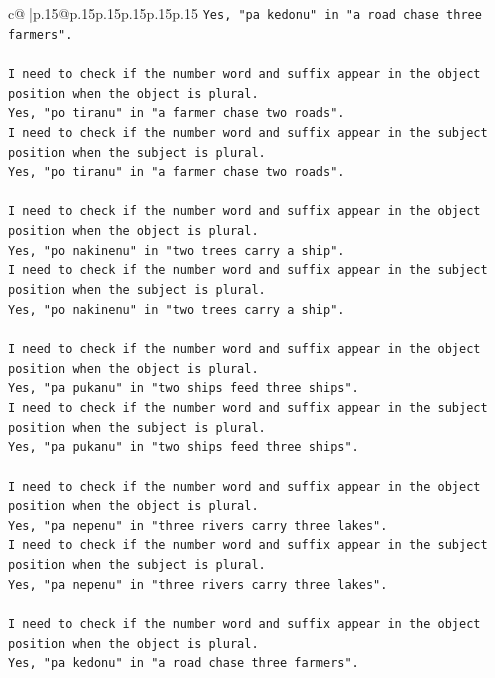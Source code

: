 \documentclass{article}
\begin{document}
{\begin{supertabular}{c@{$\;$}|p{.15\linewidth}@{}p{.15\linewidth}p{.15\linewidth}p{.15\linewidth}p{.15\linewidth}p{.15\linewidth}}
{{{\texttt{Yes, "pa kedonu" in "a road chase three farmers".} \\
\\ 
\texttt{I need to check if the number word and suffix appear in the object position when the object is plural.} \\
\texttt{Yes, "po tiranu" in "a farmer chase two roads".} \\
\texttt{I need to check if the number word and suffix appear in the subject position when the subject is plural.} \\
\texttt{Yes, "po tiranu" in "a farmer chase two roads".} \\
\\ 
\texttt{I need to check if the number word and suffix appear in the object position when the object is plural.} \\
\texttt{Yes, "po nakinenu" in "two trees carry a ship".} \\
\texttt{I need to check if the number word and suffix appear in the subject position when the subject is plural.} \\
\texttt{Yes, "po nakinenu" in "two trees carry a ship".} \\
\\ 
\texttt{I need to check if the number word and suffix appear in the object position when the object is plural.} \\
\texttt{Yes, "pa pukanu" in "two ships feed three ships".} \\
\texttt{I need to check if the number word and suffix appear in the subject position when the subject is plural.} \\
\texttt{Yes, "pa pukanu" in "two ships feed three ships".} \\
\\ 
\texttt{I need to check if the number word and suffix appear in the object position when the object is plural.} \\
\texttt{Yes, "pa nepenu" in "three rivers carry three lakes".} \\
\texttt{I need to check if the number word and suffix appear in the subject position when the subject is plural.} \\
\texttt{Yes, "pa nepenu" in "three rivers carry three lakes".} \\
\\ 
\texttt{I need to check if the number word and suffix appear in the object position when the object is plural.} \\
\texttt{Yes, "pa kedonu" in "a road chase three farmers".} \\
}}}
\end{supertabular}}
\end{document}
